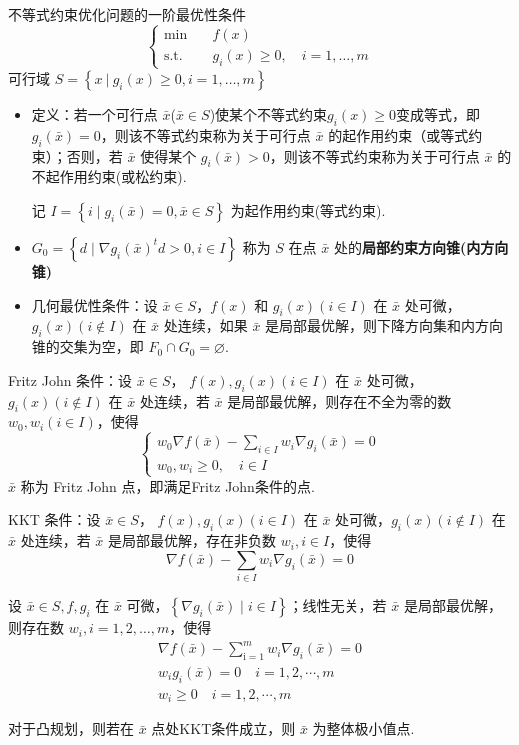 \begin{remark}
    不等式约束优化问题的一阶最优性条件\[\begin{cases}
        \min \quad &f(x)\\
        \text{s.t.} \quad &g_i(x) \ge 0, \quad i = 1, \dots, m
    \end{cases}\]
    可行域 $S = \left\{x\ |\ g_i(x) \ge 0, i = 1, \dots, m\right\}$
    \begin{itemize}
        \item 定义：若一个可行点 $\bar{x}$($\bar{x} \in S$)使某个不等式约束$g_i(x) \ge 0$变成等式，即 $g_i(\bar{x}) = 0$，则该不等式约束称为关于可行点 $\bar{x}$ 的起作用约束（或等式约束）；否则，若 $\bar{x}$ 使得某个 $g_i(\bar{x}) > 0$，则该不等式约束称为关于可行点 $\bar{x}$ 的不起作用约束(或松约束).
        
        记 $I = \left\{i \mid g_i(\bar{x}) = 0, \bar{x} \in S\right\}$ 为起作用约束(等式约束).
        \item $G_0 = \left\{d \mid \nabla g_i(\bar{x})^td > 0, i \in I\right\}$ 称为 $S$ 在点 $\bar{x}$ 处的\textbf{局部约束方向锥(内方向锥)}
        \item 几何最优性条件：设 $\bar{x} \in S$，$f(x)$ 和 $g_i(x)(i \in I)$ 在 $\bar{x}$ 处可微，$g_i(x)(i \notin I)$ 在 $\bar{x}$ 处连续，如果 $\bar{x}$ 是局部最优解，则下降方向集和内方向锥的交集为空，即 $F_0\cap G_0 = \varnothing$.
    \end{itemize}
\end{remark}

\begin{theorem}
    Fritz John 条件：设 $\bar{x} \in S$， $f(x), g_i(x)(i \in I)$ 在 $\bar{x}$ 处可微，$g_i(x)(i\notin I)$ 在 $\bar{x}$ 处连续，若 $\bar{x}$ 是局部最优解，则存在不全为零的数 $w_0, w_i(i \in I)$，使得 \[\begin{cases}
        w_{0} \nabla f(\bar{x})-\sum_{i \in I} w_{i} \nabla g_{i}(\bar{x})=0 \\
        w_{0}, w_{i} \geq 0, \quad i \in I
    \end{cases}\] $\bar{x}$ 称为 Fritz John 点，即满足Fritz John条件的点.
\end{theorem}

\begin{theorem}
    KKT 条件：设 $\bar{x} \in S$， $f(x), g_i(x)(i \in I)$ 在 $\bar{x}$ 处可微，$g_i(x)(i\notin I)$ 在 $\bar{x}$ 处连续，若 $\bar{x}$ 是局部最优解，存在非负数 $w_i, i \in I$，使得\[\nabla f(\bar{x}) - \sum_{i \in I}w_i\nabla g_i(\bar{x}) = 0\]
    
    设 $\bar{x} \in S, f, g_i$ 在 $\bar{x}$ 可微，$\left\{\nabla g_i(\bar{x}) \mid i \in I\right\}$；线性无关，若 $\bar{x}$ 是局部最优解，则存在数 $w_i, i=1, 2, \dots, m$，使得\[\begin{array}{l}
        \nabla f(\bar{x})-\sum_{\mathrm{i}=1}^{m} w_{i} \nabla g_{i}(\bar{x})=0 \\
        w_{i} g_{i}(\bar{x})=0 \quad i=1,2, \cdots, m \\
        w_{i} \geq 0 \quad i=1,2, \cdots, m 
    \end{array}\]

    对于凸规划，则若在 $\bar{x}$ 点处KKT条件成立，则 $\bar{x}$ 为整体极小值点.
\end{theorem}

